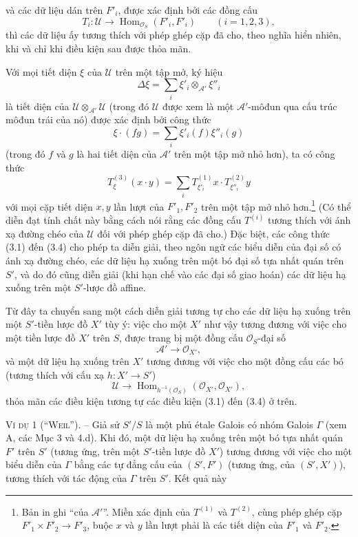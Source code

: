 \documentclass[11pt,twoside,openany]{book}
\numberwithin{equation}{section}
\newcommand{\src}[1]{%
  \phantomsection\hypertarget{src:\fgasourceid:#1}{}%
  \marginpar{\raggedleft\footnotesize\sffamily #1}%
}
\newcommand{\fgasourceid}{unset}
\begin{document}
\src{320}
và các dữ liệu dán trên $F'_i$, được xác định bởi các đồng cấu
\[
  T_i:\mathcal U\longrightarrow
  \operatorname{Hom}_{\mathcal O_S}(F'_i,F'_i)
  \qquad (i=1,2,3),
\]
thì các dữ liệu ấy tương thích với phép ghép cặp đã cho, theo nghĩa hiển nhiên,
khi và chỉ khi điều kiện sau được thỏa mãn.

Với mọi tiết diện $\xi$ của $\mathcal U$ trên một tập mở, ký hiệu
\[
  \Delta\xi=\sum_i\xi'_i\otimes_{\mathcal A'}\xi''_i
\]
là tiết diện của $\mathcal U\otimes_{\mathcal A'}\mathcal U$ (trong đó
$\mathcal U$ được xem là một $\mathcal A'$-môđun qua cấu trúc môđun trái của
nó) được xác định bởi công thức
\[
  \xi\mathbin{\cdot}(fg)=\sum_i\xi'_i(f)\xi''_i(g)
\]
(trong đó $f$ và $g$ là hai tiết diện của $\mathcal A'$ trên một tập mở nhỏ
hơn), ta có công thức
\begin{equation}
  T^{(3)}_\xi(x\mathbin{\cdot}y)
  =\sum_iT^{(1)}_{\xi'_i}x\mathbin{\cdot}T^{(2)}_{\xi''_i}y
  \tag{3.4}
\end{equation}
với mọi cặp tiết diện $x,y$ lần lượt của $F'_1,F'_2$ trên một tập mở nhỏ
hơn.\footnote{Bản in ghi ``của $\mathcal A'$''. Miền xác định của $T^{(1)}$ và
$T^{(2)}$, cùng phép ghép cặp
$F'_1\times F'_2\longrightarrow F'_3$, buộc $x$ và $y$ lần lượt phải là các
tiết diện của $F'_1$ và $F'_2$.} (Có thể diễn đạt tính chất này bằng cách nói
rằng các đồng cấu $T^{(i)}$ tương thích với ánh xạ đường chéo của $\mathcal U$
đối với phép ghép cặp đã cho.) Đặc biệt, các công thức (3.1) đến (3.4) cho phép
ta diễn giải, theo ngôn ngữ các biểu diễn của đại số có ánh xạ đường chéo, các
dữ liệu hạ xuống trên một bó đại số tựa nhất quán trên $S'$, và do đó cũng diễn
giải (khi hạn chế vào các đại số giao hoán) các dữ liệu hạ xuống trên một
$S'$-lược đồ affine.

Từ đây ta chuyển sang một cách diễn giải tương tự cho các dữ liệu hạ xuống trên
một $S'$-tiền lược đồ $X'$ tùy ý: việc cho một $X'$ như vậy tương đương với
việc cho một tiền lược đồ $X'$ trên $S$, được trang bị một đồng cấu
$\mathcal O_S$-đại số
\[
  \mathcal A'\longrightarrow\mathcal O_{X'},
\]
và một dữ liệu hạ xuống trên $X'$ tương đương với việc cho một đồng cấu các bó
(tương thích với cấu xạ $h:X'\longrightarrow S'$)
\[
  \mathcal U\longrightarrow
  \operatorname{Hom}_{h^{-1}(\mathcal O_S)}
  (\mathcal O_{X'},\mathcal O_{X'}),
\]
thỏa mãn các điều kiện tương tự các điều kiện (3.1) đến (3.4) ở trên.

\textsc{Ví dụ 1 (``Weil'').} -- Giả sử $S'/S$ là một phủ étale Galois có nhóm
Galois $\Gamma$ (xem A, các Mục 3 và 4.d). Khi đó, một dữ liệu hạ xuống trên một
bó tựa nhất quán $F'$ trên $S'$ (tương ứng, trên một $S'$-tiền lược đồ $X'$)
tương đương với việc cho một biểu diễn của $\Gamma$ bằng các tự đẳng cấu của
$(S',F')$ (tương ứng, của $(S',X')$), tương thích với tác động của $\Gamma$
trên $S'$. Kết quả này
\end{document}
